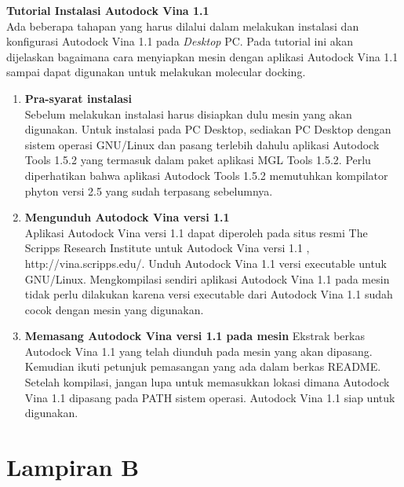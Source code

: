 \noindent \textbf{Tutorial Instalasi Autodock Vina 1.1} \\ 
Ada beberapa tahapan yang harus dilalui dalam melakukan instalasi dan
konfigurasi Autodock Vina 1.1 pada \textit{Desktop} PC. Pada tutorial ini akan dijelaskan bagaimana cara menyiapkan mesin dengan aplikasi
Autodock Vina 1.1 sampai dapat digunakan untuk melakukan molecular docking.
\begin{enumerate}
	\item \textbf{Pra-syarat instalasi} \\
	Sebelum melakukan instalasi harus disiapkan dulu mesin yang akan
	digunakan. Untuk instalasi pada PC Desktop, sediakan PC Desktop dengan sistem operasi GNU/Linux dan pasang terlebih dahulu aplikasi Autodock Tools 1.5.2 yang termasuk dalam paket aplikasi MGL Tools 1.5.2. Perlu diperhatikan bahwa aplikasi Autodock Tools 1.5.2 memutuhkan kompilator phyton versi 2.5 yang sudah terpasang sebelumnya.
	\item \textbf{Mengunduh Autodock Vina versi 1.1} \\
	Aplikasi Autodock Vina versi 1.1 dapat diperoleh pada situs resmi The Scripps	Research Institute untuk Autodock Vina versi 1.1 , http://vina.scripps.edu/. Unduh	Autodock Vina 1.1 versi executable untuk GNU/Linux. Mengkompilasi sendiri aplikasi Autodock Vina 1.1 pada mesin tidak perlu dilakukan karena versi
	executable dari Autodock Vina 1.1 sudah cocok dengan mesin yang digunakan.
	\item \textbf{Memasang Autodock Vina versi 1.1 pada mesin}
	Ekstrak berkas Autodock Vina 1.1 yang telah diunduh pada mesin yang akan dipasang. Kemudian ikuti petunjuk pemasangan yang ada dalam berkas README. Setelah kompilasi, jangan lupa untuk memasukkan lokasi dimana Autodock Vina 1.1 dipasang pada PATH sistem operasi. Autodock Vina 1.1 siap untuk digunakan.
\end{enumerate}
\chapter*{Lampiran B}

